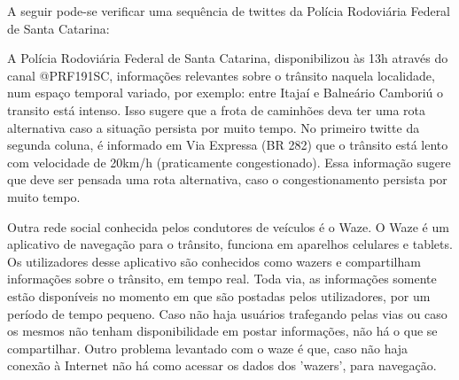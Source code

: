 \pagebreak

A seguir pode-se verificar uma sequência de twittes da Polícia Rodoviária Federal de Santa Catarina:

\begin{figure}[ht]
\quad \quad \quad \quad
{}
\end{figure}

A Polícia Rodoviária Federal de Santa Catarina, disponibilizou às 13h através do canal @PRF191SC, informações relevantes sobre o trânsito naquela localidade, 
num espaço temporal variado, por exemplo: entre Itajaí e Balneário Camboriú o transito está intenso. Isso sugere que a frota de caminhões deva ter uma
rota alternativa caso a situação persista por muito tempo. No primeiro twitte da segunda coluna, é informado em Via Expressa (BR 282) que o trânsito está lento com 
velocidade de 20km/h (praticamente congestionado). Essa informação sugere que deve ser pensada uma rota alternativa, caso o congestionamento persista por muito tempo.

Outra rede social conhecida pelos condutores de veículos é o Waze. O Waze é um aplicativo de navegação para o trânsito, funciona em aparelhos celulares e tablets. 
Os utilizadores desse aplicativo são conhecidos como wazers e compartilham informações sobre o trânsito, em tempo real. Toda via, as informações somente estão disponíveis 
no momento em que são postadas pelos utilizadores, por um período de tempo pequeno. Caso não haja usuários trafegando pelas vias ou caso os mesmos não tenham disponibilidade 
em postar informações, não há o que se compartilhar.
Outro problema levantado com o waze é que, caso não haja conexão à Internet não há como acessar os dados dos 'wazers', para navegação.

